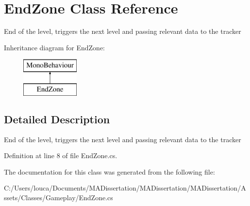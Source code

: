 \hypertarget{class_end_zone}{}\section{End\+Zone Class Reference}
\label{class_end_zone}


End of the level, triggers the next level and passing relevant data to the tracker  


Inheritance diagram for End\+Zone\+:\begin{figure}[H]
\begin{center}
\leavevmode
\includegraphics[height=2.000000cm]{class_end_zone}
\end{center}
\end{figure}


\subsection{Detailed Description}
End of the level, triggers the next level and passing relevant data to the tracker 



Definition at line 8 of file End\+Zone.\+cs.



The documentation for this class was generated from the following file\+:\begin{DoxyCompactItemize}
\item 
C\+:/\+Users/louca/\+Documents/\+M\+A\+Dissertation/\+M\+A\+Dissertation/\+M\+A\+Dissertation/\+Assets/\+Classes/\+Gameplay/End\+Zone.\+cs\end{DoxyCompactItemize}
